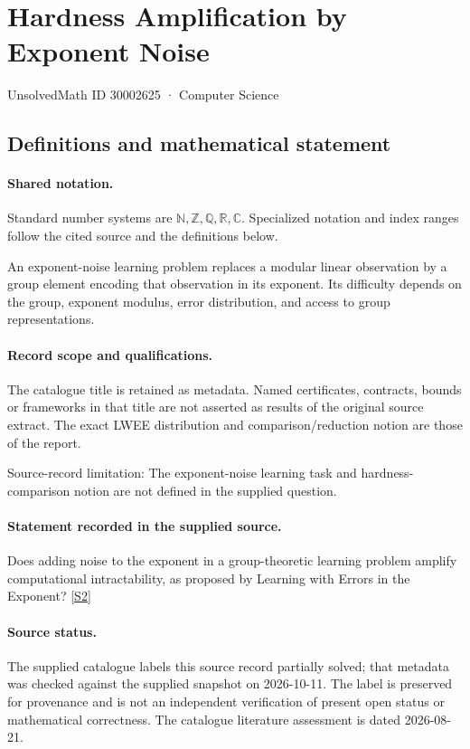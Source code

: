 \documentclass[11pt]{article}
\newcommand{\sref}[2]{\hyperlink{source:#1:#2}{[S#2]}}
\begin{document}
\setcounter{section}{30002624}
\section{Hardness Amplification by Exponent Noise}\label{30002625}
{\small\sffamily UnsolvedMath ID 30002625 · Computer Science}
\subsection{Definitions and mathematical statement}

\paragraph{Shared notation.}Standard number systems are $\mathbb N,\mathbb Z,\mathbb Q,\mathbb R,\mathbb C$. Specialized notation and index ranges follow the cited source and the definitions below.


An exponent-noise learning problem replaces a modular linear observation by a group element encoding that observation in its exponent. Its difficulty depends on the group, exponent modulus, error distribution, and access to group representations.
\paragraph{Record scope and qualifications.}
The catalogue title is retained as metadata. Named certificates, contracts, bounds or frameworks in that title are not asserted as results of the original source extract.
The exact LWEE distribution and comparison/reduction notion are those of the report.

Source-record limitation: The exponent-noise learning task and hardness-comparison notion are not defined in the supplied question.
\paragraph{Statement recorded in the supplied source.}
Does adding noise to the exponent in a group-theoretic learning problem amplify computational intractability, as proposed by Learning with Errors in the Exponent? \sref{30002625}{2}
\paragraph{Source status.}
The supplied catalogue labels this source record partially solved; that metadata was checked against the supplied snapshot on 2026-10-11. The label is preserved for provenance and is not an independent verification of present open status or mathematical correctness. The catalogue literature assessment is dated 2026-08-21.
\end{document}
